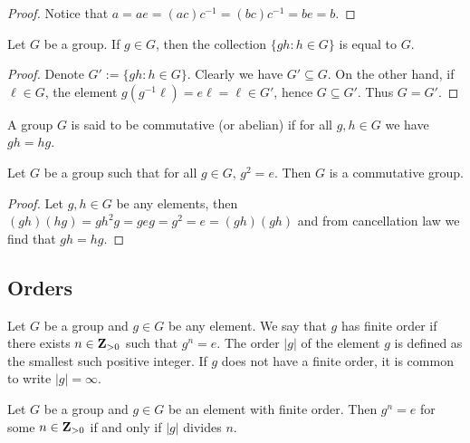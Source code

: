\begin{proof}
  Notice that \(a = a e = (a c) c^{-1} = (b c) c^{-1} = b e = b\).
\end{proof}

\begin{proposition}
  Let \(G\) be a group. If \(g \in G\), then the collection \(\{g h: h \in G\}\)
  is equal to \(G\).
\end{proposition}

\begin{proof}
  Denote \(G' := \{g h: h \in G\}\). Clearly we have \(G' \subseteq G\). On the
  other hand, if \(\ell \in G\), the element \(g (g^{-1} \ell) = e \ell = \ell
  \in G'\), hence \(G \subseteq G'\). Thus \(G = G'\).
\end{proof}

\begin{definition}
  A group \(G\) is said to be commutative (or abelian) if for all \(g, h \in G\)
  we have \(g h = h g\).
\end{definition}

\begin{corollary}
  Let \(G\) be a group such that for all \(g \in G\), \(g^2 = e\). Then \(G\) is
  a commutative group.
\end{corollary}

\begin{proof}
  Let \(g, h \in G\) be any elements, then \((g h) (h g) = g h^2 g = g e g = g^2
  = e = (g h) (g h)\) and from cancellation law we find that \(g h = h g\).
\end{proof}

\subsection{Orders}

\begin{definition}\label{def: group elem order}
  Let \(G\) be a group and \(g \in G\) be any element. We say that \(g\) has
  finite order if there exists \(n \in \mathbf{Z}_{> 0}\) such that \(g^n = e\).
  The order \(|g|\) of the element \(g\) is defined as the smallest such
  positive integer. If \(g\) does not have a finite order, it is common to write
   \(|g| = \infty\).
\end{definition}

\begin{lemma}\label{lem: order and multiples}
  Let \(G\) be a group and \(g \in G\) be an element with finite order. Then
  \(g^n = e\) for some \(n \in \mathbf{Z}_{> 0}\) if and only if \(|g|\) divides
  \(n\).
\end{lemma}

